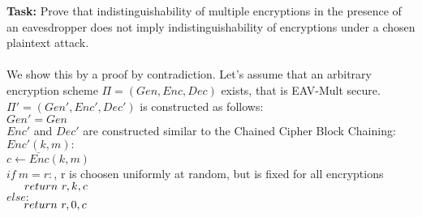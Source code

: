 \textbf{Task:} Prove that indistinguishability of multiple encryptions in the presence of an eavesdropper does
not imply indistinguishability of encryptions under a chosen plaintext attack.\\
\\
We show this by a proof by contradiction. Let's assume that an arbitrary encryption scheme \(\Pi = (Gen, Enc, Dec)\) exists, that is EAV-Mult secure.\\
\(\Pi' = (Gen', Enc', Dec')\) is constructed as follows:\\
\(Gen' = Gen\)\\
\(Enc'\) and \(Dec'\) are constructed similar to the Chained Cipher Block Chaining: \\
\(\underline{Enc'(k, m)}:\)\\
\(c \leftarrow Enc(k, m)\)\\
\(if\ m = r:\), r is choosen uniformly at random, but is fixed for all encryptions\\
\(\indent return\ r,k,c\)\\
\(else:\)\\
\(\indent return\ r,0,c\)\\


